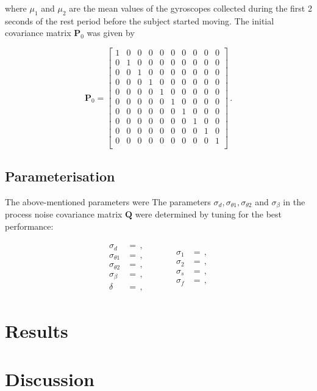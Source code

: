 \noindent
where $\mu_1$ and $\mu_2$ are the mean values of the gyroscopes collected during the first 2 seconds of the rest period before the subject started moving. The initial covariance matrix $\mathbf{P}_{0}$ was given by

\begin{equation}
\mathbf{P}_0 = \begin{bmatrix}
  1 & 0 & 0 & 0 & 0 & 0 & 0 & 0 & 0 & 0\\
  0 & 1 & 0 & 0 & 0 & 0 & 0 & 0 & 0 & 0\\
  0 & 0 & 1 & 0 & 0 & 0 & 0 & 0 & 0 & 0\\
  0 & 0 & 0 & 1 & 0 & 0 & 0 & 0 & 0 & 0\\
  0 & 0 & 0 & 0 & 1 & 0 & 0 & 0 & 0 & 0\\
  0 & 0 & 0 & 0 & 0 & 1 & 0 & 0 & 0 & 0\\
  0 & 0 & 0 & 0 & 0 & 0 & 1 & 0 & 0 & 0\\
  0 & 0 & 0 & 0 & 0 & 0 & 0 & 1 & 0 & 0\\
  0 & 0 & 0 & 0 & 0 & 0 & 0 & 0 & 1 & 0\\
  0 & 0 & 0 & 0 & 0 & 0 & 0 & 0 & 0 & 1\\
\end{bmatrix}\,.
\end{equation}

\subsection{Parameterisation}

The above-mentioned parameters were The parameters $\sigma_d, \sigma_{\theta 1}, \sigma_{\theta 2}$ and $\sigma_{\beta}$ in the process noise covariance matrix $\mathbf{Q}$ were determined by tuning for the best performance:

\begin{equation}
\begin{matrix}
	\begin{split}
	  \sigma_d &= \,, \\
	  \sigma_{\theta 1} &= \,, \\
	  \sigma_{\theta 2} &= \,, \\
	  \sigma_{\beta} &= \,, \\
	  \delta &= \,,
\end{split} \qquad \quad
    \begin{split}
	  \sigma_1 &= \,, \\
	  \sigma_2 &= \,, \\
	  \sigma_s &= \,, \\
	  \sigma_f &= \,,  
\end{split}
\end{matrix}
\end{equation}

\section{Results}

\section{Discussion}

